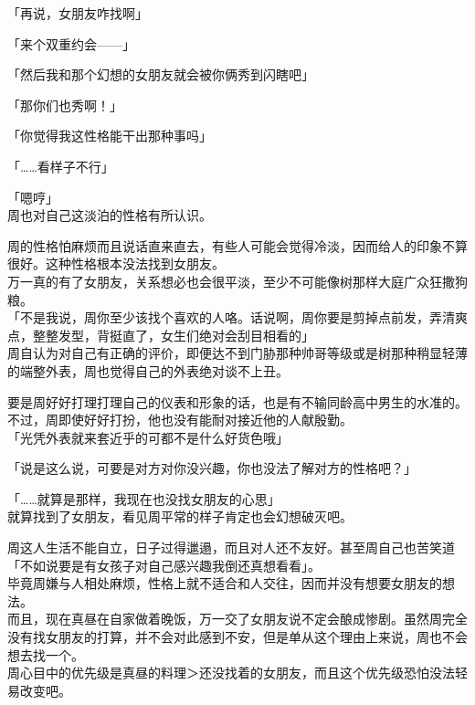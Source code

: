 「再说，女朋友咋找啊」

「来个双重约会——」

「然后我和那个幻想的女朋友就会被你俩秀到闪瞎吧」

「那你们也秀啊！」

「你觉得我这性格能干出那种事吗」

「……看样子不行」

「嗯哼」\\

周也对自己这淡泊的性格有所认识。

周的性格怕麻烦而且说话直来直去，有些人可能会觉得冷淡，因而给人的印象不算很好。这种性格根本没法找到女朋友。\\

万一真的有了女朋友，关系想必也会很平淡，至少不可能像树那样大庭广众狂撒狗粮。\\

「不是我说，周你至少该找个喜欢的人咯。话说啊，周你要是剪掉点前发，弄清爽点，整整发型，背挺直了，女生们绝对会刮目相看的」\\

周自认为对自己有正确的评价，即便达不到门胁那种帅哥等级或是树那种稍显轻薄的端整外表，周也觉得自己的外表绝对谈不上丑。

要是周好好打理打理自己的仪表和形象的话，也是有不输同龄高中男生的水准的。\\

不过，周即使好好打扮，他也没有能耐对接近他的人献殷勤。\\

「光凭外表就来套近乎的可都不是什么好货色哦」

「说是这么说，可要是对方对你没兴趣，你也没法了解对方的性格吧？」

「……就算是那样，我现在也没找女朋友的心思」\\

就算找到了女朋友，看见周平常的样子肯定也会幻想破灭吧。

周这人生活不能自立，日子过得邋遢，而且对人还不友好。甚至周自己也苦笑道「不如说要是有女孩子对自己感兴趣我倒还真想看看」。\\

毕竟周嫌与人相处麻烦，性格上就不适合和人交往，因而并没有想要女朋友的想法。\\

而且，现在真昼在自家做着晚饭，万一交了女朋友说不定会酿成惨剧。虽然周完全没有找女朋友的打算，并不会对此感到不安，但是单从这个理由上来说，周也不会想去找一个。\\

周心目中的优先级是真昼的料理＞还没找着的女朋友，而且这个优先级恐怕没法轻易改变吧。\\

